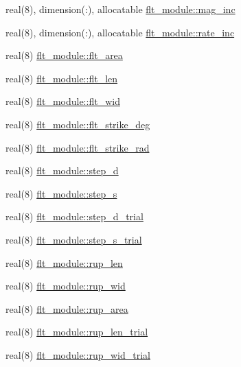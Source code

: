 \begin{DoxyCompactItemize}
\item 
real(8), dimension(\+:), allocatable \hyperlink{namespaceflt__module_af9892b4dca9fdd6644278654eb95f0d2}{flt\+\_\+module\+::mag\+\_\+inc}
\item 
real(8), dimension(\+:), allocatable \hyperlink{namespaceflt__module_af4abd22305b27392695e298e409485eb}{flt\+\_\+module\+::rate\+\_\+inc}
\item 
real(8) \hyperlink{namespaceflt__module_a5afcf609fce08da82c3c6f3c6ae623d1}{flt\+\_\+module\+::flt\+\_\+area}
\item 
real(8) \hyperlink{namespaceflt__module_a4bc1d05951c8d1ad1263099b2168fc52}{flt\+\_\+module\+::flt\+\_\+len}
\item 
real(8) \hyperlink{namespaceflt__module_a0a0ca2180f3d4b230a85f4e74898c1ab}{flt\+\_\+module\+::flt\+\_\+wid}
\item 
real(8) \hyperlink{namespaceflt__module_a5f628ae600d8550ab693d874d7a26bb0}{flt\+\_\+module\+::flt\+\_\+strike\+\_\+deg}
\item 
real(8) \hyperlink{namespaceflt__module_a618a9014909e559bdbedf80be8a159a3}{flt\+\_\+module\+::flt\+\_\+strike\+\_\+rad}
\item 
real(8) \hyperlink{namespaceflt__module_ad4dbd8fe640ed7c127b993e51b31c2cb}{flt\+\_\+module\+::step\+\_\+d}
\item 
real(8) \hyperlink{namespaceflt__module_aac3ac3d5dda31c71db0f70b6c04bde99}{flt\+\_\+module\+::step\+\_\+s}
\item 
real(8) \hyperlink{namespaceflt__module_a5a750dfe01760a5134b5cd98aa924b01}{flt\+\_\+module\+::step\+\_\+d\+\_\+trial}
\item 
real(8) \hyperlink{namespaceflt__module_abbc6ad6d8104d02669bab58b22654f6b}{flt\+\_\+module\+::step\+\_\+s\+\_\+trial}
\item 
real(8) \hyperlink{namespaceflt__module_aa83583fdd38e91b447b8fbf1ae9f833c}{flt\+\_\+module\+::rup\+\_\+len}
\item 
real(8) \hyperlink{namespaceflt__module_a5cbe7cb918ea3ecbe35270bdcc9ab63d}{flt\+\_\+module\+::rup\+\_\+wid}
\item 
real(8) \hyperlink{namespaceflt__module_aec90f89a37148a6fe2fa52df737b51ef}{flt\+\_\+module\+::rup\+\_\+area}
\item 
real(8) \hyperlink{namespaceflt__module_acb649d537953bd575e6bbded75b6c99b}{flt\+\_\+module\+::rup\+\_\+len\+\_\+trial}
\item 
real(8) \hyperlink{namespaceflt__module_a6cefaab59a5e1f02e62505b132fe9384}{flt\+\_\+module\+::rup\+\_\+wid\+\_\+trial}

\end{DoxyCompactItemize}
